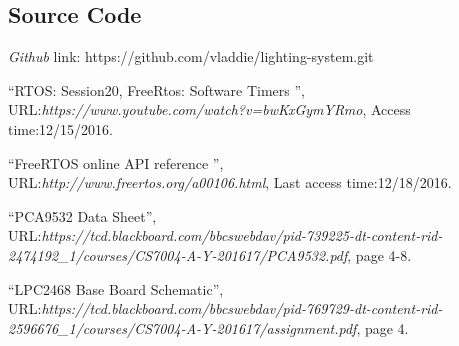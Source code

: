 {\subsection{Source Code}
\textit{Github} link: https://github.com/vladdie/lighting-system.git



\begin{thebibliography}{99}
 
 \textquotedblleft RTOS: Session20, FreeRtos: Software Timers \textquotedblright ,\\
URL:\textit{https://www.youtube.com/watch?v=bwKxGymYRmo},
Access time:12/15/2016.

 \textquotedblleft FreeRTOS online API reference \textquotedblright ,\\
URL:\textit{http://www.freertos.org/a00106.html},
Last access time:12/18/2016.
 
\bibitem{} \textquotedblleft PCA9532 Data Sheet\textquotedblright ,\\
URL:\textit{https://tcd.blackboard.com/bbcswebdav/pid-739225-dt-content-rid-2474192\_1/courses/CS7004-A-Y-201617/PCA9532.pdf}, page 4-8.

\bibitem{} \textquotedblleft LPC2468 Base Board Schematic\textquotedblright ,\\
URL:\textit{https://tcd.blackboard.com/bbcswebdav/pid-769729-dt-content-rid-2596676\_1/courses/CS7004-A-Y-201617/assignment.pdf}, page 4.
 
\end{thebibliography}




}

